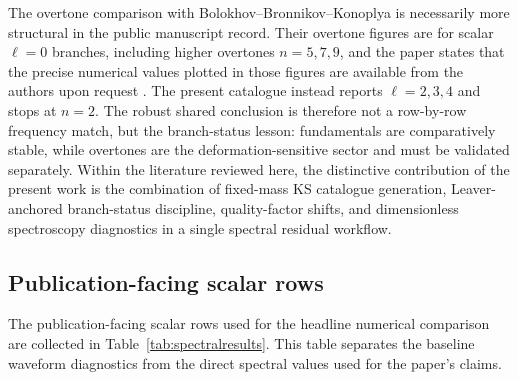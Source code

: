 ﻿\documentclass[12pt,a4paper]{article}
\begin{document}
The overtone comparison with Bolokhov--Bronnikov--Konoplya is necessarily more structural in the public manuscript record. Their overtone figures are for scalar \(\ell=0\) branches, including higher overtones \(n=5,7,9\), and the paper states that the precise numerical values plotted in those figures are available from the authors upon request \cite{Bolokhov2025}. The present catalogue instead reports \(\ell=2,3,4\) and stops at \(n=2\). The robust shared conclusion is therefore not a row-by-row frequency match, but the branch-status lesson: fundamentals are comparatively stable, while overtones are the deformation-sensitive sector and must be validated separately. Within the literature reviewed here, the distinctive contribution of the present work is the combination of fixed-mass KS catalogue generation, Leaver-anchored branch-status discipline, quality-factor shifts, and dimensionless spectroscopy diagnostics in a single spectral residual workflow.
\FloatBarrier

\subsection{Publication-facing scalar rows}

The publication-facing scalar rows used for the headline numerical comparison are collected in Table~\ref{tab:spectralresults}. This table separates the baseline waveform diagnostics from the direct spectral values used for the paper's claims.
\end{document}
